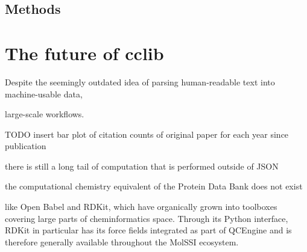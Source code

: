 \documentclass[num-refs]{wiley-article}
\begin{document}
\subsection{Methods}

\section{The future of cclib}

Despite the seemingly outdated idea of parsing human-readable text into machine-usable data,

large-scale workflows.\cite{Abbott2019,StJohn2020}

TODO insert bar plot of citation counts of original paper for each year since publication

there is still a long tail of computation that is performed outside of JSON

the computational chemistry equivalent of the Protein Data Bank does not exist

like Open Babel and RDKit, which have organically grown into toolboxes covering large parts of cheminformatics space. Through its Python interface, RDKit in particular has its force fields integrated as part of QCEngine and is therefore generally available throughout the MolSSI ecosystem.
\end{document}
